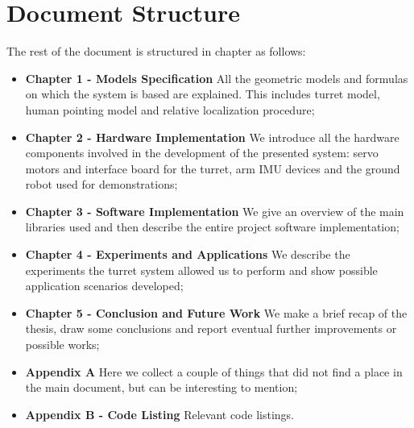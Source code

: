 \section*{Document Structure}
The rest of the document is structured in chapter as follows:
\begin{itemize}
    \item \textbf{Chapter 1 - Models Specification}  All the geometric models and formulas on which the system is based are explained. This includes turret model, human pointing model and relative localization procedure;
    \item \textbf{Chapter 2 - Hardware Implementation}  We introduce all the hardware components involved in the development of the presented system: servo motors and interface board for the turret, arm IMU devices and the ground robot used for demonstrations;
    \item \textbf{Chapter 3 - Software Implementation} We give an overview of the main libraries used and then describe the entire project software implementation;
    \item \textbf{Chapter 4 - Experiments and Applications} We describe the experiments the turret system allowed us to perform and show possible application scenarios developed;
    \item \textbf{Chapter 5 - Conclusion and Future Work} We make a brief recap of the thesis, draw some conclusions and report eventual further improvements or possible works;
    \item \textbf{Appendix A} Here we collect a couple of things that did not find a place in the main document, but can be interesting to mention;
    \item \textbf{Appendix B - Code Listing} Relevant code listings.
\end{itemize}
